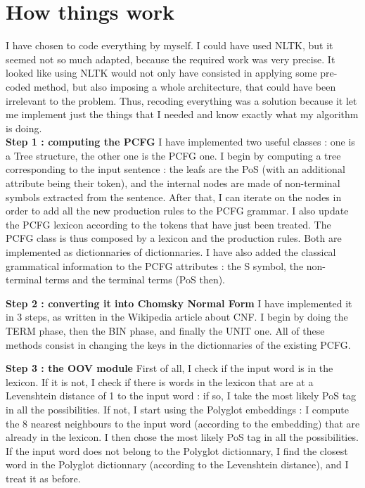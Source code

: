 \documentclass{article}
\begin{document}
\newcommand{\R}{\mathbb{R}}
\newcommand{\p}{\mathbf{P}}

\maketitle

\section{How things work}
I have chosen to code everything by myself. I could have used NLTK, but it seemed not so much adapted, because the required work was very precise. It looked like using NLTK would not only have consisted in applying some pre-coded method, but also imposing a whole architecture, that could have been irrelevant to the problem. Thus, recoding everything was a solution because it let me implement just the things that I needed and know exactly what my algorithm is doing. \\
\textbf{Step 1 : computing the PCFG}
I have implemented two useful classes : one is a Tree structure, the other one is the PCFG one. I begin by computing a tree corresponding to the input sentence : the leafs are the PoS (with an additional attribute being their token), and the internal nodes are made of non-terminal symbols extracted from the sentence. After that, I can iterate on the nodes in order to add all the new production rules to the PCFG grammar. I also update the PCFG lexicon according to the tokens that have just been treated. The PCFG class is thus composed by a lexicon and the production rules. Both are implemented as dictionnaries of dictionnaries. I have also added the classical grammatical information to the PCFG attributes : the S symbol, the non-terminal terms and the terminal terms (PoS then).

\textbf{Step 2 : converting it into Chomsky Normal Form}
I have implemented it in 3 steps, as written in the Wikipedia article about CNF. I begin by doing the TERM phase, then the BIN phase, and finally the UNIT one. All of these methods consist in changing the keys in the dictionnaries of the existing PCFG.

\textbf{Step 3 : the OOV module}
First of all, I check if the input word is in the lexicon. If it is not, I check if there is words in the lexicon that are at a Levenshtein distance of 1 to the input word : if so, I take the most likely PoS tag in all the possibilities. If not, I start using the Polyglot embeddings : I compute the 8 nearest neighbours to the input word (according to the embedding) that are already in the lexicon. I then chose the most likely PoS tag in all the possibilities. If the input word does not belong to the Polyglot dictionnary, I find the closest word in the Polyglot dictionnary (according to the Levenshtein distance), and I treat it as before.
\end{document}
